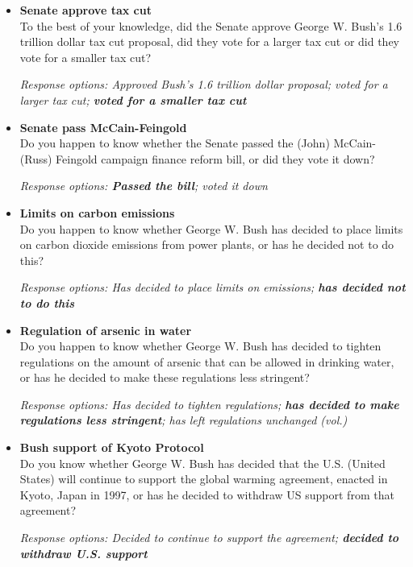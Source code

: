 \documentclass[12pt, letterpaper]{article}
\begin{document}
  \begin{itemize}
\item \textbf{Senate approve tax cut}\\
To the best of your knowledge, did the Senate approve George W. Bush's 1.6 trillion dollar tax cut proposal, did they vote for a larger tax cut or did they vote for a smaller tax cut?

\textit{Response options: Approved Bush's 1.6 trillion dollar proposal; voted for a larger tax cut; \textbf{voted for a smaller tax cut}}
\end{itemize}

  \begin{itemize}
\item \textbf{Senate pass McCain-Feingold}\\
Do you happen to know whether the Senate passed the (John) McCain-(Russ) Feingold campaign finance reform bill, or did they vote it down?

\textit{Response options: \textbf{Passed the bill}; voted it down}
\end{itemize}

  \begin{itemize}
\item \textbf{Limits on carbon emissions}\\
Do you happen to know whether George W. Bush has decided to place limits on carbon dioxide emissions from power plants, or has he decided not to do this?

\textit{Response options: Has decided to place limits on emissions; \textbf{has decided not to do this}}
\end{itemize}

  \begin{itemize}
\item \textbf{Regulation of arsenic in water}\\
Do you happen to know whether George W. Bush has decided to tighten regulations on the amount of arsenic that can be allowed in drinking water, or has he decided to make these regulations less stringent?

\textit{Response options: Has decided to tighten regulations; \textbf{has decided to make regulations less stringent}; has left regulations unchanged (vol.)}
\end{itemize}

  \begin{itemize}
\item \textbf{Bush support of Kyoto Protocol}\\
Do you know whether George W. Bush has decided that the U.S. (United States) will continue to support the global warming agreement, enacted in Kyoto, Japan in 1997, or has he decided to withdraw US support from that agreement?

\textit{Response options: Decided to continue to support the agreement; \textbf{decided to withdraw U.S. support}}
\end{itemize}
\end{document}
